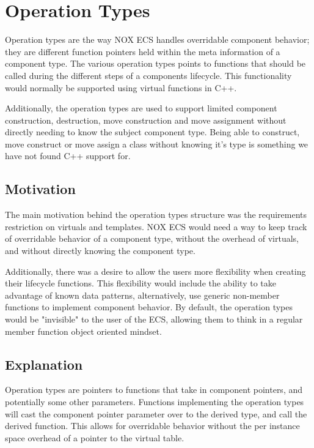 \section{Operation Types}
\label{subsec:detailed_operation_types}
Operation types are the way NOX ECS handles overridable component behavior; they are different function pointers held within the meta information of a component type.
The various operation types points to functions that should be called during the different steps
of a components lifecycle.
This functionality would normally be supported using virtual functions in C++.

Additionally, the operation types are used to support limited component construction, destruction, move construction and move assignment without directly needing to know the subject component type.
Being able to construct, move construct or move assign a class without knowing it's type
is something we have not found C++ support for.

\subsection{Motivation}
The main motivation behind the operation types structure was the requirements restriction on virtuals
and templates.
NOX ECS would need a way to keep track of overridable behavior of a component type, without the overhead of virtuals,
and without directly knowing the component type.

Additionally, there was a desire to allow the users more flexibility when creating their lifecycle functions.
This flexibility would include the ability to take advantage of known data patterns,
alternatively, use generic non-member functions to implement component behavior.
By default, the operation types would be "invisible" to the user of the ECS, allowing them to think in a regular member function object oriented mindset.

\subsection{Explanation}
Operation types are pointers to functions that take in component pointers,
and potentially some other parameters.
Functions implementing the operation types will cast the component pointer parameter over to the derived type,
and call the derived function.
This allows for overridable behavior without the per instance space overhead of a pointer to the virtual table.

